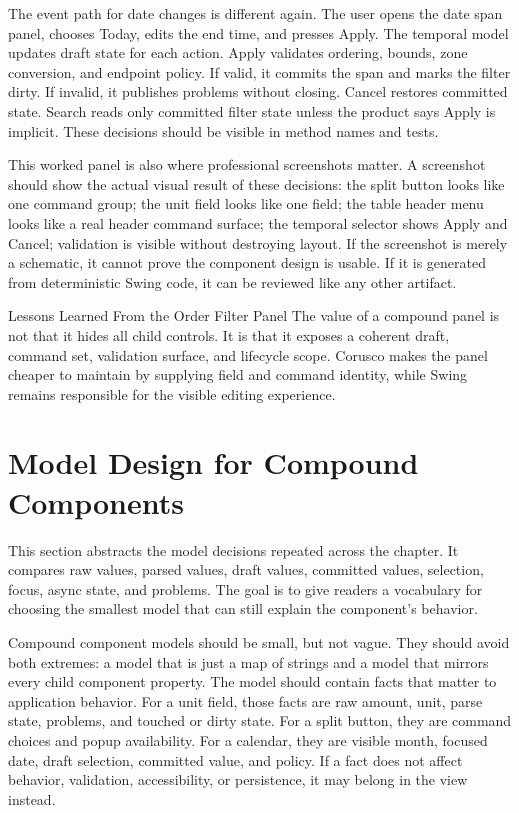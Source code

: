 The event path for date changes is different again. The user opens the date
span panel, chooses Today, edits the end time, and presses Apply. The temporal
model updates draft state for each action. Apply validates ordering, bounds,
zone conversion, and endpoint policy. If valid, it commits the span and marks
the filter dirty. If invalid, it publishes problems without closing. Cancel
restores committed state. Search reads only committed filter state unless the
product says Apply is implicit. These decisions should be visible in method
names and tests.

This worked panel is also where professional screenshots matter. A screenshot
should show the actual visual result of these decisions: the split button
looks like one command group; the unit field looks like one field; the table
header menu looks like a real header command surface; the temporal selector
shows Apply and Cancel; validation is visible without destroying layout. If
the screenshot is merely a schematic, it cannot prove the component design is
usable. If it is generated from deterministic Swing code, it can be reviewed
like any other artifact.

\begin{principlebox}{Lessons Learned From the Order Filter Panel}
The value of a compound panel is not that it hides all child controls. It is that
it exposes a coherent draft, command set, validation surface, and lifecycle
scope. Corusco makes the panel cheaper to maintain by supplying field and command
identity, while Swing remains responsible for the visible editing experience.
\end{principlebox}

\section{Model Design for Compound Components}

\begin{roadmapbox}
This section abstracts the model decisions repeated across the chapter. It
compares raw values, parsed values, draft values, committed values, selection,
focus, async state, and problems. The goal is to give readers a vocabulary for
choosing the smallest model that can still explain the component's behavior.
\end{roadmapbox}

Compound component models should be small, but not vague. They should avoid
both extremes: a model that is just a map of strings and a model that mirrors
every child component property. The model should contain facts that matter to
application behavior. For a unit field, those facts are raw amount, unit,
parse state, problems, and touched or dirty state. For a split button, they
are command choices and popup availability. For a calendar, they are visible
month, focused date, draft selection, committed value, and policy. If a fact
does not affect behavior, validation, accessibility, or persistence, it may
belong in the view instead.

